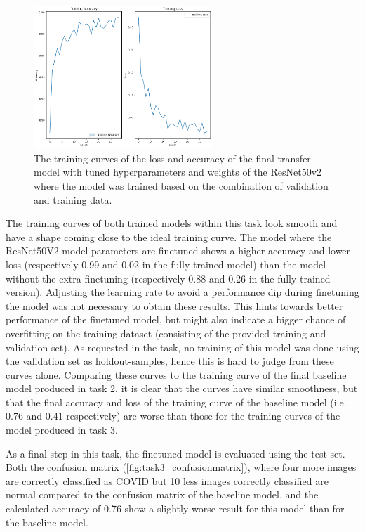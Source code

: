 \documentclass[conference]{IEEEtran}
\begin{document}
\begin{figure}[t] \centering \includegraphics[width=0.6\textwidth]{fig_task3_training_curves_train_model_finetuned_resnet.png} 
	\caption{The training curves of the loss and accuracy of the final transfer model with tuned hyperparameters and weights of the ResNet50v2 where the model was trained based on the combination of validation and training data.} 
	\label{fig:task3_curves_final_resnet} 
\end{figure}


The training curves of both trained models within this task look smooth and have a shape coming close to the ideal training curve. 
The model where the ResNet50V2 model parameters are finetuned shows a higher accuracy and lower loss (respectively 0.99 and 0.02 in the fully trained model) than the model without the extra finetuning (respectively 0.88 and 0.26 in the fully trained version). Adjusting the learning rate to avoid a performance dip during finetuning the model was not necessary to obtain these results.
This hints towards better performance of the finetuned model, but might also indicate a bigger chance of overfitting on the training dataset (consisting of the provided training and validation set). As requested in the task, no training of this model was done using the validation set as holdout-samples, hence this is hard to judge from these curves alone.
Comparing these curves to the training curve of the final baseline model produced in task 2, it is clear that the curves have similar smoothness, but that the final accuracy and loss of the training curve of the baseline model (i.e. 0.76 and 0.41 respectively) are worse than those for the training curves of the model produced in task 3.

As a final step in this task, the finetuned model is evaluated using the test set. Both the confusion matrix (\ref{fig:task3_confusionmatrix}), where four more images are correctly classified as COVID but 10 less images correctly classified are normal compared to the confusion matrix of the baseline model, and the calculated accuracy of 0.76 show a slightly worse result for this model than for the baseline model. 
\end{document}
